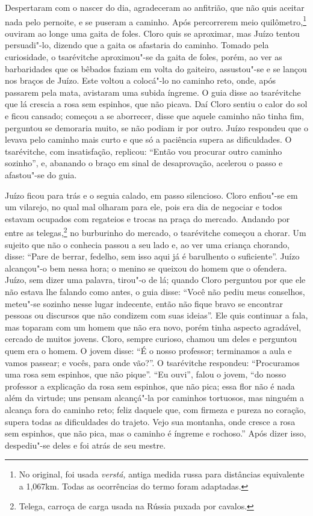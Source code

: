 Despertaram com o nascer do dia, agradeceram ao anfitrião, que não quis
aceitar nada pelo pernoite, e se puseram a caminho. Após percorrerem
meio quilômetro,\footnote{No original, foi usada \emph{verstá,} antiga
  medida russa para distâncias equivalente a 1,067km. Todas as
  ocorrências do termo foram adaptadas.} ouviram ao longe uma gaita de
foles. Cloro quis se aproximar, mas Juízo tentou persuadi"-lo, dizendo
que a gaita os afastaria do caminho. Tomado pela curiosidade, o
tsarévitche aproximou"-se da gaita de foles, porém, ao ver as
barbaridades que os bêbados faziam em volta do gaiteiro, assustou"-se e
se lançou nos braços de Juízo. Este voltou a colocá"-lo no caminho reto,
onde, após passarem pela mata, avistaram uma subida íngreme. O guia disse
ao tsarévitche que lá crescia a rosa sem espinhos, que não picava. Daí
Cloro sentiu o calor do sol e ficou cansado; começou a se aborrecer,
disse que aquele caminho não tinha fim, perguntou se demoraria muito, se
não podiam ir por outro. Juízo respondeu que o levava pelo caminho mais
curto e que só a paciência supera as dificuldades. O tsarévitche, com
insatisfação, replicou: ``Então vou procurar outro caminho sozinho'', e,
abanando o braço em sinal de desaprovação, acelerou o passo e afastou"-se
do guia.

Juízo ficou para trás e o seguia calado, em passo silencioso. Cloro
enfiou"-se em um vilarejo, no qual mal olharam para ele, pois era dia de
negociar e todos estavam ocupados com regateios e trocas na praça do
mercado. Andando por entre as telegas,\footnote{Telega, carroça de carga
  usada na Rússia puxada por cavalos.} no burburinho do mercado, o
tsarévitche começou a chorar. Um sujeito que não o conhecia passou a seu
lado e, ao ver uma criança chorando, disse: ``Pare de berrar, fedelho,
sem isso aqui já é barulhento o suficiente''. Juízo alcançou"-o bem nessa
hora; o menino se queixou do homem que o ofendera. Juízo, sem dizer uma
palavra, tirou"-o de lá; quando Cloro perguntou por que ele não estava
lhe falando como antes, o guia disse: ``Você não pediu meus conselhos,
meteu"-se sozinho nesse lugar indecente, então não fique bravo se
encontrar pessoas ou discursos que não condizem com suas ideias''. Ele
quis continuar a fala, mas toparam com um homem que não era novo, porém
tinha aspecto agradável, cercado de muitos jovens. Cloro, sempre
curioso, chamou um deles e perguntou quem era o homem. O jovem disse:
``É o nosso professor; terminamos a aula e vamos passear; e vocês, para
onde vão?''. O tsarévitche respondeu: ``Procuramos uma rosa sem
espinhos, que não pique''. ``Eu ouvi'', falou o jovem, ``do nosso
professor a explicação da rosa sem espinhos, que não pica; essa flor não
é nada além da virtude; uns pensam alcançá"-la por caminhos tortuosos,
mas ninguém a alcança fora do caminho reto; feliz daquele que, com
firmeza e pureza no coração, supera todas as dificuldades do trajeto.
Vejo sua montanha, onde cresce a rosa sem espinhos, que não pica, mas o
caminho é íngreme e rochoso.'' Após dizer isso, despediu"-se deles e foi
atrás de seu mestre.

